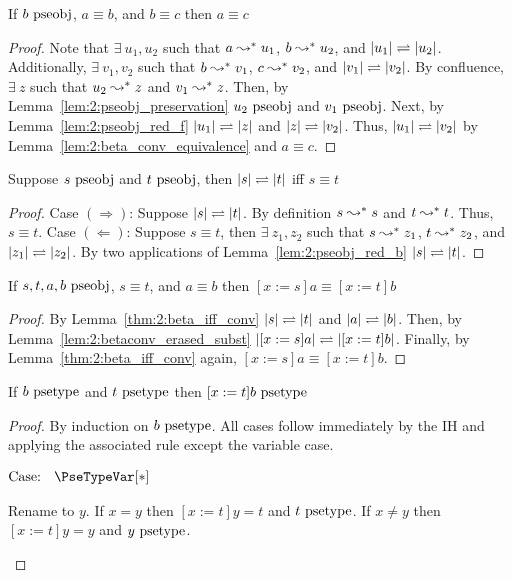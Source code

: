\begin{theorem}
    If $b~\mbox{\normalfont pseobj}$, $a \equiv b$, and $b \equiv c$ then $a \equiv c$
    \label{thm:2:conv_trans}
\end{theorem}
\begin{proof}
    Note that $\exists\ u_1, u_2$ such that $a \leadsto^* u_1$, $b \leadsto^* u_2$, and $|u_1| \rightleftharpoons |u_2|$.
    Additionally, $\exists\ v_1, v_2$ such that $b \leadsto^* v_1$, $c \leadsto^* v_2$, and $|v_1| \rightleftharpoons |v_2|$.
    By confluence, $\exists\ z$ such that $u_2 \leadsto^* z$ and $v_1 \leadsto^* z$.
    Then, by Lemma~\ref{lem:2:pseobj_preservation} $u_2~\mbox{\normalfont pseobj}$ and $v_1~\mbox{\normalfont pseobj}$.
    Next, by Lemma~\ref{lem:2:pseobj_red_f} $|u_1| \rightleftharpoons |z|$ and $|z| \rightleftharpoons |v_2|$.
    Thus, $|u_1| \rightleftharpoons |v_2|$ by Lemma~\ref{lem:2:beta_conv_equivalence} and $a \equiv c$.
\end{proof}

\begin{theorem}
    Suppose $s~\mbox{\normalfont pseobj}$ and $t~\mbox{\normalfont pseobj}$, then $|s| \rightleftharpoons |t|$ iff $s \equiv t$
    \label{thm:2:beta_iff_conv}
\end{theorem}
\begin{proof}
    Case $(\Rightarrow)$:
    Suppose $|s| \rightleftharpoons |t|$.
    By definition $s \leadsto^* s$ and $t \leadsto^* t$.
    Thus, $s \equiv t$.
    Case $(\Leftarrow)$:
    Suppose $s \equiv t$, then $\exists\ z_1, z_2$ such that $s \leadsto^* z_1$, $t \leadsto^* z_2$, and $|z_1| \rightleftharpoons |z_2|$.
    By two applications of Lemma~\ref{lem:2:pseobj_red_b} $|s| \rightleftharpoons |t|$.
\end{proof}

\begin{lemma}
    If $s, t, a, b~\mbox{\normalfont pseobj}$, $s \equiv t$, and $a \equiv b$ then $[x := s]a \equiv [x := t]b$
    \label{lem:2:conv_subst}
\end{lemma}
\begin{proof}
    By Lemma~\ref{thm:2:beta_iff_conv} $|s| \rightleftharpoons |t|$ and $|a| \rightleftharpoons |b|$.
    Then, by Lemma~\ref{lem:2:betaconv_erased_subst} $|[x := s]a| \rightleftharpoons |[x := t]b|$.
    Finally, by Lemma~\ref{thm:2:beta_iff_conv} again, $[x := s]a \equiv [x := t]b$.
\end{proof}



\begin{lemma}
    If $b~\mbox{\normalfont psetype}$ and $t~\mbox{\normalfont psetype}$ then $[x := t]b~\mbox{\normalfont psetype}$
    \label{lem:2:psetype_subst}
\end{lemma}
\begin{proof}
    By induction on $b~\mbox{\normalfont psetype}$.
    All cases follow immediately by the IH and applying the associated rule except the variable case.

    $\text{Case: }\begin{array}{c} \PseTypeVar[*] \end{array}$
    \begin{proofcase}
        Rename to $y$.
        If $x = y$ then $[x := t]y = t$ and $t~\mbox{\normalfont psetype}$.
        If $x \neq y$ then $[x := t]y = y$ and $y~\mbox{\normalfont psetype}$.
    \end{proofcase}
\end{proof}

